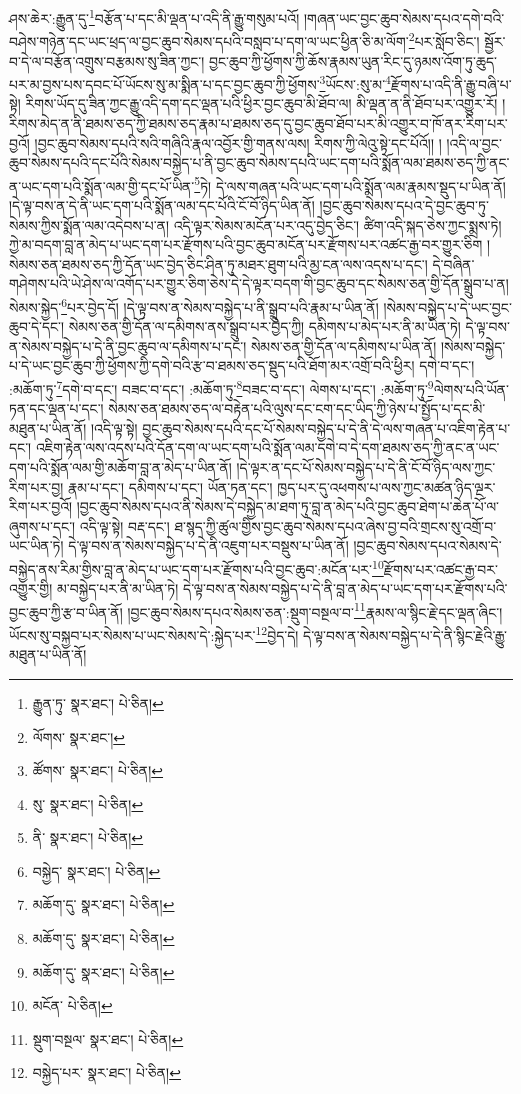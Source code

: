 ཤས་ཆེར་:རྒྱུན་དུ་\footnote{རྒྱུན་ཏུ་  སྣར་ཐང་།  པེ་ཅིན། }བརྩོན་པ་དང་མི་ལྡན་པ་འདི་ནི་རྒྱུ་གསུམ་པའོ། །གཞན་ཡང་བྱང་ཆུབ་སེམས་དཔའ་དགེ་བའི་བཤེས་གཉེན་དང་ཡང་ཕྲད་ལ་བྱང་ཆུབ་སེམས་དཔའི་བསླབ་པ་དག་ལ་ཡང་ཕྱིན་ཅི་མ་ལོག་\footnote{ལོགས་  སྣར་ཐང་། }པར་སློབ་ཅིང་། སྦྱོར་བ་དེ་ལ་བརྩོན་འགྲུས་བརྩམས་སུ་ཟིན་ཀྱང་། བྱང་ཆུབ་ཀྱི་ཕྱོགས་ཀྱི་ཆོས་རྣམས་ཡུན་རིང་དུ་ཉམས་འོག་ཏུ་ཆུད་པར་མ་བྱས་པས་དབང་པོ་ཡོངས་སུ་མ་སྨིན་པ་དང་བྱང་ཆུབ་ཀྱི་ཕྱོགས་\footnote{ཚོགས་  སྣར་ཐང་།  པེ་ཅིན། }ཡོངས་:སུ་མ་\footnote{སུ་  སྣར་ཐང་།  པེ་ཅིན། }རྫོགས་པ་འདི་ནི་རྒྱུ་བཞི་པ་སྟེ། རིགས་ཡོད་དུ་ཟིན་ཀྱང་རྒྱུ་འདི་དག་དང་ལྡན་པའི་ཕྱིར་བྱང་ཆུབ་མི་ཐོབ་ལ། མི་ལྡན་ན་ནི་ཐོབ་པར་འགྱུར་རོ། །རིགས་མེད་ན་ནི་ཐམས་ཅད་ཀྱི་ཐམས་ཅད་རྣམ་པ་ཐམས་ཅད་དུ་བྱང་ཆུབ་ཐོབ་པར་མི་འགྱུར་བ་ཁོ་ནར་རིག་པར་བྱའོ། །བྱང་ཆུབ་སེམས་དཔའི་སའི་གཞིའི་རྣལ་འབྱོར་གྱི་གནས་ལས། རིགས་ཀྱི་ལེའུ་སྟེ་དང་པོའོ།། །
།འདི་ལ་བྱང་ཆུབ་སེམས་དཔའི་དང་པོའི་སེམས་བསྐྱེད་པ་ནི་བྱང་ཆུབ་སེམས་དཔའི་ཡང་དག་པའི་སྨོན་ལམ་ཐམས་ཅད་ཀྱི་ནང་ན་ཡང་དག་པའི་སྨོན་ལམ་གྱི་དང་པོ་ཡིན་\footnote{ནི་  སྣར་ཐང་།  པེ་ཅིན། }ཏེ། དེ་ལས་གཞན་པའི་ཡང་དག་པའི་སྨོན་ལམ་རྣམས་སྡུད་པ་ཡིན་ནོ། །དེ་ལྟ་བས་ན་དེ་ནི་ཡང་དག་པའི་སྨོན་ལམ་དང་པོའི་ངོ་བོ་ཉིད་ཡིན་ནོ། །བྱང་ཆུབ་སེམས་དཔའ་དེ་བྱང་ཆུབ་ཏུ་སེམས་ཀྱིས་སྨོན་ལམ་འདེབས་པ་ན། འདི་ལྟར་སེམས་མངོན་པར་འདུ་བྱེད་ཅིང་། ཚིག་འདི་སྐད་ཅེས་ཀྱང་སྨྲས་ཏེ། ཀྱེ་མ་བདག་བླ་ན་མེད་པ་ཡང་དག་པར་རྫོགས་པའི་བྱང་ཆུབ་མངོན་པར་རྫོགས་པར་འཚང་རྒྱ་བར་གྱུར་ཅིག །སེམས་ཅན་ཐམས་ཅད་ཀྱི་དོན་ཡང་བྱེད་ཅིང་ཤིན་ཏུ་མཐར་ཐུག་པའི་མྱ་ངན་ལས་འདས་པ་དང་། དེ་བཞིན་གཤེགས་པའི་ཡེ་ཤེས་ལ་འགོད་པར་གྱུར་ཅིག་ཅེས་དེ་དེ་ལྟར་བདག་གི་བྱང་ཆུབ་དང་སེམས་ཅན་གྱི་དོན་སྒྲུབ་པ་ན། སེམས་སྐྱེད་\footnote{བསྐྱེད་  སྣར་ཐང་།  པེ་ཅིན། }པར་བྱེད་དོ། །དེ་ལྟ་བས་ན་སེམས་བསྐྱེད་པ་ནི་སྒྲུབ་པའི་རྣམ་པ་ཡིན་ནོ། །སེམས་བསྐྱེད་པ་དེ་ཡང་བྱང་ཆུབ་དེ་དང་། སེམས་ཅན་གྱི་དོན་ལ་དམིགས་ནས་སྒྲུབ་པར་བྱེད་ཀྱི། དམིགས་པ་མེད་པར་ནི་མ་ཡིན་ཏེ། དེ་ལྟ་བས་ན་སེམས་བསྐྱེད་པ་དེ་ནི་བྱང་ཆུབ་ལ་དམིགས་པ་དང་། སེམས་ཅན་གྱི་དོན་ལ་དམིགས་པ་ཡིན་ནོ། །སེམས་བསྐྱེད་པ་དེ་ཡང་བྱང་ཆུབ་ཀྱི་ཕྱོགས་ཀྱི་དགེ་བའི་རྩ་བ་ཐམས་ཅད་སྡུད་པའི་ཐོག་མར་འགྲོ་བའི་ཕྱིར། དགེ་བ་དང་། :མཆོག་ཏུ་\footnote{མཆོག་དུ་  སྣར་ཐང་།  པེ་ཅིན། }དགེ་བ་དང་། བཟང་བ་དང་། :མཆོག་ཏུ་\footnote{མཆོག་དུ་  སྣར་ཐང་།  པེ་ཅིན། }བཟང་བ་དང་། ལེགས་པ་དང་། :མཆོག་ཏུ་\footnote{མཆོག་དུ་  སྣར་ཐང་།  པེ་ཅིན། }ལེགས་པའི་ཡོན་ཏན་དང་ལྡན་པ་དང་། སེམས་ཅན་ཐམས་ཅད་ལ་བརྟེན་པའི་ལུས་དང་ངག་དང་ཡིད་ཀྱི་ཉེས་པ་སྤྱོད་པ་དང་མི་མཐུན་པ་ཡིན་ནོ། །འདི་ལྟ་སྟེ། བྱང་ཆུབ་སེམས་དཔའི་དང་པོ་སེམས་བསྐྱེད་པ་དེ་ནི་དེ་ལས་གཞན་པ་འཇིག་རྟེན་པ་དང་། འཇིག་རྟེན་ལས་འདས་པའི་དོན་དག་ལ་ཡང་དག་པའི་སྨོན་ལམ་དགེ་བ་དེ་དག་ཐམས་ཅད་ཀྱི་ནང་ན་ཡང་དག་པའི་སྨོན་ལམ་གྱི་མཆོག་བླ་ན་མེད་པ་ཡིན་ནོ། །དེ་ལྟར་ན་དང་པོ་སེམས་བསྐྱེད་པ་དེ་ནི་ངོ་བོ་ཉིད་ལས་ཀྱང་རིག་པར་བྱ། རྣམ་པ་དང་། དམིགས་པ་དང་། ཡོན་ཏན་དང་། ཁྱད་པར་དུ་འཕགས་པ་ལས་ཀྱང་མཚན་ཉིད་ལྔར་རིག་པར་བྱའོ། །བྱང་ཆུབ་སེམས་དཔའ་ནི་སེམས་དེ་བསྐྱེད་མ་ཐག་ཏུ་བླ་ན་མེད་པའི་བྱང་ཆུབ་ཐེག་པ་ཆེན་པོ་ལ་ཞུགས་པ་དང་། འདི་ལྟ་སྟེ། བརྡ་དང་། ཐ་སྙད་ཀྱི་ཚུལ་གྱིས་བྱང་ཆུབ་སེམས་དཔའ་ཞེས་བྱ་བའི་གྲངས་སུ་འགྲོ་བ་ཡང་ཡིན་ཏེ། དེ་ལྟ་བས་ན་སེམས་བསྐྱེད་པ་དེ་ནི་འཇུག་པར་བསྡུས་པ་ཡིན་ནོ། །བྱང་ཆུབ་སེམས་དཔའ་སེམས་དེ་བསྐྱེད་ནས་རིམ་གྱིས་བླ་ན་མེད་པ་ཡང་དག་པར་རྫོགས་པའི་བྱང་ཆུབ་:མངོན་པར་\footnote{མངོན་  པེ་ཅིན། }རྫོགས་པར་འཚང་རྒྱ་བར་འགྱུར་གྱི། མ་བསྐྱེད་པར་ནི་མ་ཡིན་ཏེ། དེ་ལྟ་བས་ན་སེམས་བསྐྱེད་པ་དེ་ནི་བླ་ན་མེད་པ་ཡང་དག་པར་རྫོགས་པའི་བྱང་ཆུབ་ཀྱི་རྩ་བ་ཡིན་ནོ། །བྱང་ཆུབ་སེམས་དཔའ་སེམས་ཅན་:སྡུག་བསྔལ་བ་\footnote{སྡུག་བསྔལ་  སྣར་ཐང་།  པེ་ཅིན། }རྣམས་ལ་སྙིང་རྗེ་དང་ལྡན་ཞིང་། ཡོངས་སུ་བསྐྱབ་པར་སེམས་པ་ཡང་སེམས་དེ་:སྐྱེད་པར་\footnote{བསྐྱེད་པར་  སྣར་ཐང་།  པེ་ཅིན། }བྱེད་དེ། དེ་ལྟ་བས་ན་སེམས་བསྐྱེད་པ་དེ་ནི་སྙིང་རྗེའི་རྒྱུ་མཐུན་པ་ཡིན་ནོ། 